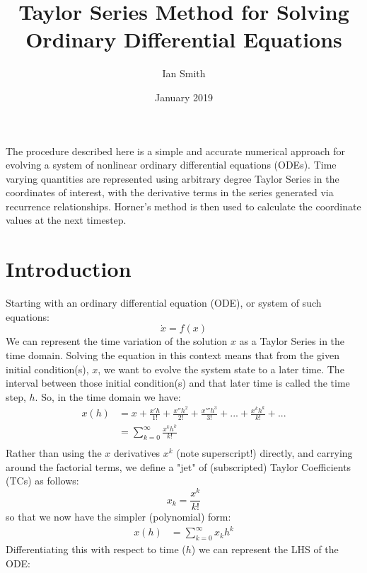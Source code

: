 \documentclass[11pt]{article}
\title{\textbf{Taylor Series Method for Solving Ordinary Differential Equations}}
\author{Ian Smith}
\date{January 2019}
\begin{document}
\maketitle

\abstract
The procedure described here is a simple and accurate numerical approach for evolving a system of nonlinear ordinary differential equations (ODEs).
Time varying quantities are represented using arbitrary degree Taylor Series in the coordinates of interest, with the derivative terms in the series generated via recurrence relationships.
Horner's method is then used to calculate the coordinate values at the next timestep. 

\section{Introduction}
Starting with an ordinary differential equation (ODE), or system of such equations:
\begin{equation}
\dot{x} = f(x)
\end{equation}
We can represent the time variation of the solution $x$ as a Taylor Series in the time domain.
Solving the equation in this context means that from the given initial condition(s), $x$, we want to evolve the system state to a later time.
The interval between those initial condition(s) and that later time is called the time step, $h$.
So, in the time domain we have:
\begin{equation}
\begin{aligned}
x(h) &= x + \frac{x'h}{1!} + \frac{x''h^2}{2!} + \frac{x'''h^3}{3!} + ... + \frac{x^kh^k}{k!} + ...\\
&= \sum_{k=0}^{\infty} \frac{x^kh^k}{k!}\\
\end{aligned}
\end{equation}
Rather than using the $x$ derivatives $x^k$ (note superscript!) directly, and carrying around the factorial terms, we define a "jet" of (subscripted) Taylor Coefficients (TCs) as follows:
\begin{equation}
x_k = \frac{x^k}{k!}
\end{equation}
so that we now have the simpler (polynomial) form:
\begin{equation}
\begin{aligned}
x(h) &= \sum_{k=0}^{\infty} x_kh^k
\end{aligned}
\end{equation}
Differentiating this with respect to time ($h$) we can represent the LHS of the ODE:
\end{document}
